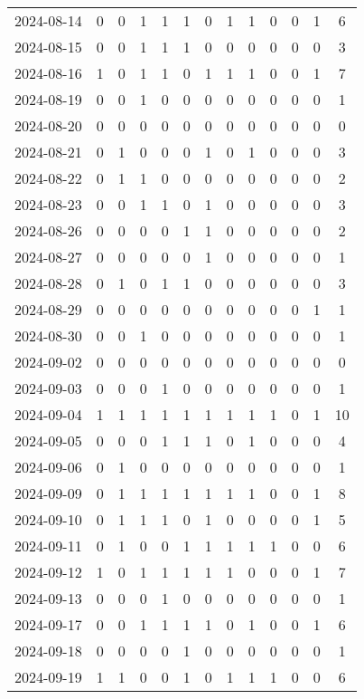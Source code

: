 \documentclass[dvipdfmx,oneside]{article}
\begin{document}
\begin{longtable}{lcccccccccccc}
2024-08-14 & 0 & 0 & 1 & 1 & 1 & 0 & 1 & 1 & 0 & 0 & 1 & 6 \\
2024-08-15 & 0 & 0 & 1 & 1 & 1 & 0 & 0 & 0 & 0 & 0 & 0 & 3 \\
2024-08-16 & 1 & 0 & 1 & 1 & 0 & 1 & 1 & 1 & 0 & 0 & 1 & 7 \\
2024-08-19 & 0 & 0 & 1 & 0 & 0 & 0 & 0 & 0 & 0 & 0 & 0 & 1 \\
2024-08-20 & 0 & 0 & 0 & 0 & 0 & 0 & 0 & 0 & 0 & 0 & 0 & 0 \\
2024-08-21 & 0 & 1 & 0 & 0 & 0 & 1 & 0 & 1 & 0 & 0 & 0 & 3 \\
2024-08-22 & 0 & 1 & 1 & 0 & 0 & 0 & 0 & 0 & 0 & 0 & 0 & 2 \\
2024-08-23 & 0 & 0 & 1 & 1 & 0 & 1 & 0 & 0 & 0 & 0 & 0 & 3 \\
2024-08-26 & 0 & 0 & 0 & 0 & 1 & 1 & 0 & 0 & 0 & 0 & 0 & 2 \\
2024-08-27 & 0 & 0 & 0 & 0 & 0 & 1 & 0 & 0 & 0 & 0 & 0 & 1 \\
2024-08-28 & 0 & 1 & 0 & 1 & 1 & 0 & 0 & 0 & 0 & 0 & 0 & 3 \\
2024-08-29 & 0 & 0 & 0 & 0 & 0 & 0 & 0 & 0 & 0 & 0 & 1 & 1 \\
2024-08-30 & 0 & 0 & 1 & 0 & 0 & 0 & 0 & 0 & 0 & 0 & 0 & 1 \\
2024-09-02 & 0 & 0 & 0 & 0 & 0 & 0 & 0 & 0 & 0 & 0 & 0 & 0 \\
2024-09-03 & 0 & 0 & 0 & 1 & 0 & 0 & 0 & 0 & 0 & 0 & 0 & 1 \\
2024-09-04 & 1 & 1 & 1 & 1 & 1 & 1 & 1 & 1 & 1 & 0 & 1 & 10 \\
2024-09-05 & 0 & 0 & 0 & 1 & 1 & 1 & 0 & 1 & 0 & 0 & 0 & 4 \\
2024-09-06 & 0 & 1 & 0 & 0 & 0 & 0 & 0 & 0 & 0 & 0 & 0 & 1 \\
2024-09-09 & 0 & 1 & 1 & 1 & 1 & 1 & 1 & 1 & 0 & 0 & 1 & 8 \\
2024-09-10 & 0 & 1 & 1 & 1 & 0 & 1 & 0 & 0 & 0 & 0 & 1 & 5 \\
2024-09-11 & 0 & 1 & 0 & 0 & 1 & 1 & 1 & 1 & 1 & 0 & 0 & 6 \\
2024-09-12 & 1 & 0 & 1 & 1 & 1 & 1 & 1 & 0 & 0 & 0 & 1 & 7 \\
2024-09-13 & 0 & 0 & 0 & 1 & 0 & 0 & 0 & 0 & 0 & 0 & 0 & 1 \\
2024-09-17 & 0 & 0 & 1 & 1 & 1 & 1 & 0 & 1 & 0 & 0 & 1 & 6 \\
2024-09-18 & 0 & 0 & 0 & 0 & 1 & 0 & 0 & 0 & 0 & 0 & 0 & 1 \\
2024-09-19 & 1 & 1 & 0 & 0 & 1 & 0 & 1 & 1 & 1 & 0 & 0 & 6 \\

\end{longtable}
\end{document}
